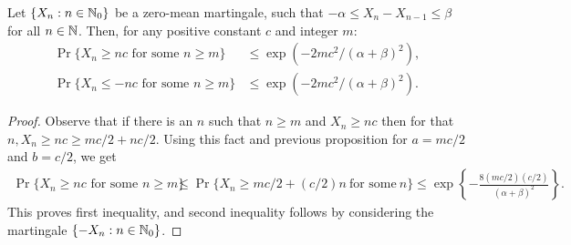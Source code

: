 \documentclass[a4paper,10pt,english]{article}
\begin{document}
\begin{thm} 
Let $\{X_n : n \in \mathbb{N}_0\}$ be a zero-mean martingale, such that $-\alpha \leq X_n-X_{n-1} \leq \beta $ for all $n \in \mathbb{N}$. 
Then, for any positive constant $c$ and integer $m$:
\begin{align*}
\Pr\{X_n \geq nc\text{ for some }n \geq m\} &\leq \exp\left(-2mc^2/{(\alpha+\beta)}^2\right),\\
\Pr\{X_n \leq -nc\text{ for some }n \geq m\} &\leq \exp\left(-2mc^2/{(\alpha+\beta)}^2\right).
\end{align*}
\end{thm}
\begin{proof}
Observe that if there is an $n$ such that $n \geq m$ and $X_n \geq nc$ then for that $n, X_n \geq nc \geq mc/2+nc/2$. 
Using this fact and previous proposition for $a = mc/2$ and $b = c/2$, we get
\begin{align*}
\Pr\{X_n \geq nc\text{ for some }n \geq m\} &\leq \Pr\{X_n \geq mc/2+(c/2)n~ \text{for some} ~ n\}\leq \exp\left\{-\frac{8(mc/2)(c/2)}{(\alpha+\beta)^2}\right\}.
\end{align*}
This proves first inequality, and second inequality follows by considering the martingale $\{-X_n: n \in \mathbb{N}_0\}$.
\end{proof}

\end{document}
